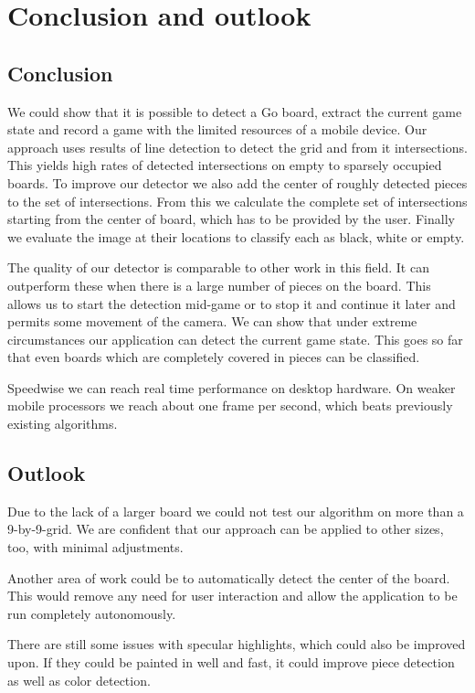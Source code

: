 
\chapter{Conclusion and outlook}
\section{Conclusion}
We could show that it is possible to detect a Go board, extract the current game state and record a game with the limited resources of a mobile device. Our approach uses results of line detection to detect the grid and from it intersections. This yields high rates of detected intersections on empty to sparsely occupied boards. To improve our detector we also add the center of roughly detected pieces to the set of intersections. From this we calculate the complete set of intersections starting from the center of board, which has to be provided by the user. Finally we evaluate the image at their locations to classify each as black, white or empty.

The quality of our detector is comparable to other work in this field. It can outperform these when there is a large number of pieces on the board. This allows us to start the detection mid-game or to stop it and continue it later and permits some movement of the camera. We can show that under extreme circumstances our application can detect the current game state. This goes so far that even boards which are completely covered in pieces can be classified.

Speedwise we can reach real time performance on desktop hardware. On weaker mobile processors we reach about one frame per second, which beats previously existing algorithms.

\section{Outlook}
Due to the lack of a larger board we could not test our algorithm on more than a 9-by-9-grid. We are confident that our approach can be applied to other sizes, too, with minimal adjustments.

Another area of work could be to automatically detect the center of the board. This would remove any need for user interaction and allow the application to be run completely autonomously.

There are still some issues with specular highlights, which could also be improved upon. If they could be painted in well and fast, it could improve piece detection as well as color detection.
